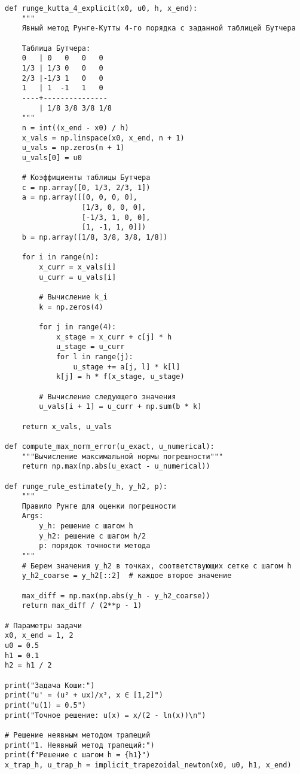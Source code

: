 \documentclass[12pt,a4paper]{article}
\begin{document}
\begin{verbatim}
def runge_kutta_4_explicit(x0, u0, h, x_end):
    """
    Явный метод Рунге-Кутты 4-го порядка с заданной таблицей Бутчера
    
    Таблица Бутчера:
    0   | 0   0   0   0
    1/3 | 1/3 0   0   0
    2/3 |-1/3 1   0   0
    1   | 1  -1   1   0
    ----+---------------
        | 1/8 3/8 3/8 1/8
    """
    n = int((x_end - x0) / h)
    x_vals = np.linspace(x0, x_end, n + 1)
    u_vals = np.zeros(n + 1)
    u_vals[0] = u0
    
    # Коэффициенты таблицы Бутчера
    c = np.array([0, 1/3, 2/3, 1])
    a = np.array([[0, 0, 0, 0],
                  [1/3, 0, 0, 0],
                  [-1/3, 1, 0, 0],
                  [1, -1, 1, 0]])
    b = np.array([1/8, 3/8, 3/8, 1/8])
    
    for i in range(n):
        x_curr = x_vals[i]
        u_curr = u_vals[i]
        
        # Вычисление k_i
        k = np.zeros(4)
        
        for j in range(4):
            x_stage = x_curr + c[j] * h
            u_stage = u_curr
            for l in range(j):
                u_stage += a[j, l] * k[l]
            k[j] = h * f(x_stage, u_stage)
        
        # Вычисление следующего значения
        u_vals[i + 1] = u_curr + np.sum(b * k)
    
    return x_vals, u_vals

def compute_max_norm_error(u_exact, u_numerical):
    """Вычисление максимальной нормы погрешности"""
    return np.max(np.abs(u_exact - u_numerical))

def runge_rule_estimate(y_h, y_h2, p):
    """
    Правило Рунге для оценки погрешности
    Args:
        y_h: решение с шагом h
        y_h2: решение с шагом h/2
        p: порядок точности метода
    """
    # Берем значения y_h2 в точках, соответствующих сетке с шагом h
    y_h2_coarse = y_h2[::2]  # каждое второе значение
    
    max_diff = np.max(np.abs(y_h - y_h2_coarse))
    return max_diff / (2**p - 1)

# Параметры задачи
x0, x_end = 1, 2
u0 = 0.5
h1 = 0.1
h2 = h1 / 2

print("Задача Коши:")
print("u' = (u² + ux)/x², x ∈ [1,2]")
print("u(1) = 0.5")
print("Точное решение: u(x) = x/(2 - ln(x))\n")

# Решение неявным методом трапеций
print("1. Неявный метод трапеций:")
print(f"Решение с шагом h = {h1}")
x_trap_h, u_trap_h = implicit_trapezoidal_newton(x0, u0, h1, x_end)


\end{verbatim}
\end{document}
